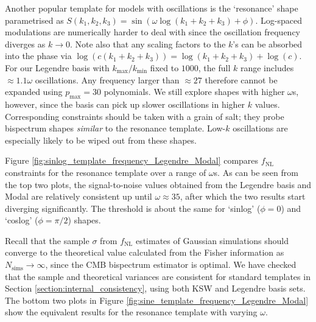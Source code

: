 Another popular template for models with oscillations is the `resonance' shape parametrised as $S(k_1, k_2, k_3) = \sin(\omega \log(k_1 + k_2 + k_3 ) + \phi)$. Log-spaced modulations are numerically harder to deal with since the oscillation frequency diverges as $k \rightarrow 0$. Note also that any scaling factors to the $k$'s can be absorbed into the phase via $\log(c(k_1 + k_2 + k_3)) = \log(k_1 + k_2 + k_3) + \log(c)$. For our Legendre basis with $k_\text{max}/k_\text{min}$ fixed to $1000$, the full $k$ range includes $\approx 1.1\omega$ oscillations. Any frequency larger than $\approx 27$ therefore cannot be expanded using $p_\text{max}=30$ polynomials. We still explore shapes with higher $\omega$s, however, since the basis can pick up slower oscillations in higher $k$ values. Corresponding constraints should be taken with a grain of salt; they probe bispectrum shapes \textit{similar} to the resonance template. Low-$k$ oscillations are especially likely to be wiped out from these shapes.

Figure \ref{fig:sinlog_template_frequency_Legendre_Modal} compares $f_\text{NL}$ constraints for the resonance template over a range of $\omega$s. As can be seen from the top two plots, the signal-to-noise values obtained from the Legendre basis and Modal are relatively consistent up until $\omega \approx 35$, after which the two results start diverging significantly. The threshold is about the same for `sinlog' ($\phi = 0$) and `coslog' ($\phi=\pi/2$) shapes.

Recall that the sample $\sigma$ from $f_\text{NL}$ estimates of Gaussian simulations should converge to the theoretical value calculated from the Fisher information as $N_\text{sims}\rightarrow\infty$, since the CMB bispectrum estimator is optimal. We have checked that the sample and theoretical variances are consistent for standard templates in Section \ref{section:internal_consistency}, using both KSW and Legendre basis sets. The bottom two plots in Figure \ref{fig:sine_template_frequency_Legendre_Modal} show the equivalent results for the resonance template with varying $\omega$.

